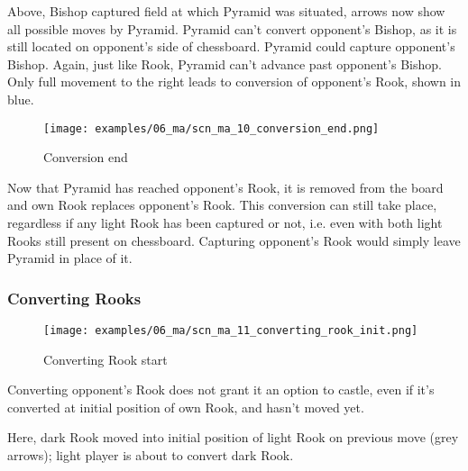 Above, Bishop captured field at which Pyramid was situated, arrows now show all
possible moves by Pyramid. Pyramid can't convert opponent's Bishop, as it is still
located on opponent's side of chessboard. Pyramid could capture opponent's Bishop.
Again, just like Rook, Pyramid can't advance past opponent's Bishop. Only full
movement to the right leads to conversion of opponent's Rook, shown in blue.

\clearpage %

\noindent
\begin{figure}[!h]
\texttt{[image: examples/06\_ma/scn\_ma\_10\_conversion\_end.png]}
\caption{Conversion end}
\label{fig:scn_ma_10_conversion_end}
\end{figure}

Now that Pyramid has reached opponent's Rook, it is removed from the board and
own Rook replaces opponent's Rook. This conversion can still take place, regardless
if any light Rook has been captured or not, i.e. even with both light Rooks still
present on chessboard. Capturing opponent's Rook would simply leave Pyramid in
place of it.

\clearpage %

\subsubsection*{Converting Rooks}
\label{sec:Mayan Ascendancy/Pyramid/Conversion/Converting Rooks}

\vspace*{-1.1\baselineskip}
\noindent
\begin{figure}[!h]
\texttt{[image: examples/06\_ma/scn\_ma\_11\_converting\_rook\_init.png]}
\caption{Converting Rook start}
\label{fig:scn_ma_11_converting_rook_init}
\end{figure}

Converting opponent's Rook does not grant it an option to castle, even if it's
converted at initial position of own Rook, and hasn't moved yet.

Here, dark Rook moved into initial position of light Rook on previous move
(grey arrows); light player is about to convert dark Rook.

\clearpage %

